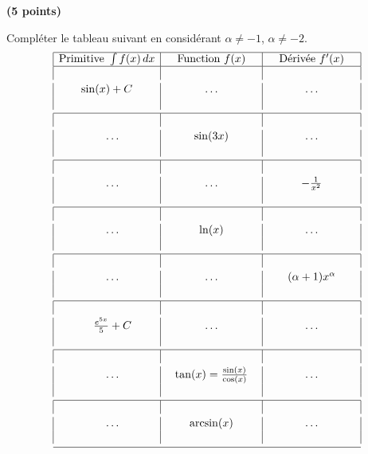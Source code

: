 \begin{exercice}\label{exoExosenvrac-0001}\textbf{ (5 points) }

Compléter le tableau suivant en considérant \( \alpha\neq -1\), \( \alpha\neq -2\). 
  \begin{equation}
    \begin{array}{|c|c|c|}\hline 
      \textrm{Primitive } \int f(x)\, dx & \quad\textrm{Function } f(x)\quad &\quad \textrm{Dérivée } f'(x)\quad \\\hline 
      \vspace{1mm}&&\\
      \quad\sin(x)+C\quad & \quad\ldots \quad&\quad \ldots \quad\\
      \vspace{1mm}&&\\\hline
      \vspace{1mm}&&\\
      \quad\ldots & \sin(3x) & \ldots \\
      \vspace{1mm}&&\\\hline 
      \vspace{1mm}&&\\
      \quad\ldots & \ldots & -\frac{1}{x^2}\\
      \vspace{1mm}&&\\\hline 
      \vspace{1mm}&&\\
      \quad\ldots & \ln(x) & \ldots \\
      \vspace{1mm}&&\\\hline 
      \vspace{1mm}&&\\
      \quad\ldots & \ldots & \quad(\alpha+1)x^\alpha\quad \\
      \vspace{1mm}&&\\\hline 
      \vspace{1mm}&&\\
      \quad\frac{e^{5x}}{5}+C & \ldots & \ldots \\
      \vspace{1mm}&&\\\hline 
      \vspace{1mm}&&\\
      \quad\ldots  & \tan(x)=\frac{\sin(x)}{\cos(x)} & \ldots \\
      \vspace{1mm}&&\\\hline 
      \vspace{1mm}&&\\
      \quad\ldots  &\quad \arcsin(x)\quad & \ldots \\
      \vspace{1mm}&&\\\hline 
    \end{array}
  \end{equation}

  
\end{exercice}
